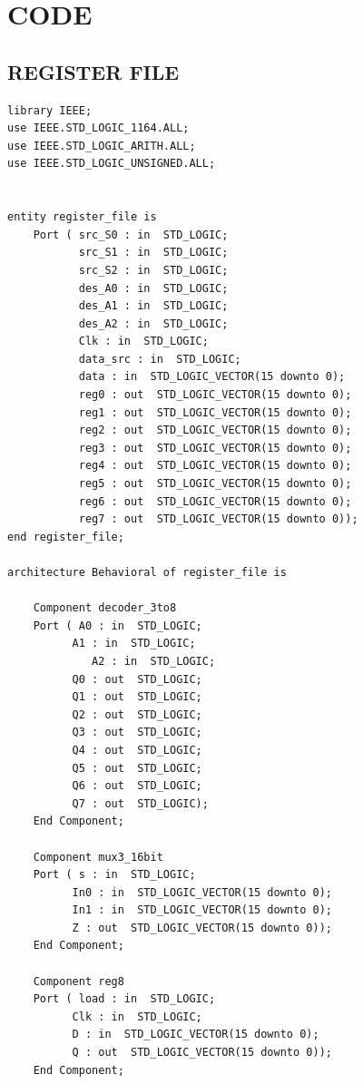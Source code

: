 \documentclass{article}
\begin{document}
\thispagestyle{empty}
\cleardoublepage
{}
\setcounter{page}{1}

\pagebreak
\section{CODE}

\subsection{REGISTER FILE}\label{sec:intro}

\begin{lstlisting}
library IEEE;
use IEEE.STD_LOGIC_1164.ALL;
use IEEE.STD_LOGIC_ARITH.ALL;
use IEEE.STD_LOGIC_UNSIGNED.ALL;


entity register_file is
    Port ( src_S0 : in  STD_LOGIC;
           src_S1 : in  STD_LOGIC;
           src_S2 : in  STD_LOGIC;
           des_A0 : in  STD_LOGIC;
           des_A1 : in  STD_LOGIC;
           des_A2 : in  STD_LOGIC;
           Clk : in  STD_LOGIC;
           data_src : in  STD_LOGIC;
           data : in  STD_LOGIC_VECTOR(15 downto 0);
           reg0 : out  STD_LOGIC_VECTOR(15 downto 0);
           reg1 : out  STD_LOGIC_VECTOR(15 downto 0);
           reg2 : out  STD_LOGIC_VECTOR(15 downto 0);
           reg3 : out  STD_LOGIC_VECTOR(15 downto 0);
           reg4 : out  STD_LOGIC_VECTOR(15 downto 0);
           reg5 : out  STD_LOGIC_VECTOR(15 downto 0);
           reg6 : out  STD_LOGIC_VECTOR(15 downto 0);
           reg7 : out  STD_LOGIC_VECTOR(15 downto 0));
end register_file;

architecture Behavioral of register_file is

	Component decoder_3to8
	Port ( A0 : in  STD_LOGIC;
          A1 : in  STD_LOGIC;
			 A2 : in  STD_LOGIC;
          Q0 : out  STD_LOGIC;
          Q1 : out  STD_LOGIC;
          Q2 : out  STD_LOGIC;
          Q3 : out  STD_LOGIC;
          Q4 : out  STD_LOGIC;
          Q5 : out  STD_LOGIC;
          Q6 : out  STD_LOGIC;
          Q7 : out  STD_LOGIC);
	End Component;

	Component mux3_16bit
	Port ( s : in  STD_LOGIC;
          In0 : in  STD_LOGIC_VECTOR(15 downto 0);
          In1 : in  STD_LOGIC_VECTOR(15 downto 0);
          Z : out  STD_LOGIC_VECTOR(15 downto 0));
	End Component;
	
	Component reg8
	Port ( load : in  STD_LOGIC;
          Clk : in  STD_LOGIC;
          D : in  STD_LOGIC_VECTOR(15 downto 0);
          Q : out  STD_LOGIC_VECTOR(15 downto 0));
	End Component;
	

\end{lstlisting}
\end{document}
